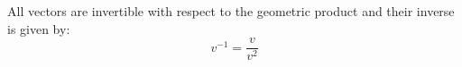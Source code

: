 \begin{lemma}\label{l:invertibility}
	All vectors are invertible with respect to the geometric product and their inverse is given by:
	\[v^{-1} = \frac{v}{v^2}\]
\end{lemma}

